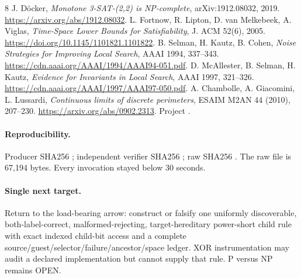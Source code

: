 \documentclass[11pt]{article}
\begin{document}
\begin{thebibliography}{8}
 J. D\"ocker, \emph{Monotone 3-SAT-(2,2) is NP-complete},
arXiv:1912.08032, 2019. \url{https://arxiv.org/abs/1912.08032}.
 L. Fortnow, R. Lipton, D. van Melkebeek, A. Viglas,
\emph{Time-Space Lower Bounds for Satisfiability}, J. ACM 52(6), 2005.
\url{https://doi.org/10.1145/1101821.1101822}.
 B. Selman, H. Kautz, B. Cohen, \emph{Noise Strategies for
Improving Local Search}, AAAI 1994, 337--343.
\url{https://cdn.aaai.org/AAAI/1994/AAAI94-051.pdf}.
 D. McAllester, B. Selman, H. Kautz, \emph{Evidence for
Invariants in Local Search}, AAAI 1997, 321--326.
\url{https://cdn.aaai.org/AAAI/1997/AAAI97-050.pdf}.
 A. Chambolle, A. Giacomini, L. Lussardi, \emph{Continuous
limits of discrete perimeters}, ESAIM M2AN 44 (2010), 207--230.
\url{https://arxiv.org/abs/0902.2313}.
 Project .
\end{thebibliography}

\paragraph{Reproducibility.}
Producer SHA256 ;
independent verifier SHA256 ;
raw SHA256 .
The raw file is 67,194 bytes.  Every invocation stayed below 30 seconds.

\paragraph{Single next target.}
Return to the load-bearing arrow: construct or falsify one uniformly
discoverable, both-label-correct, malformed-rejecting, target-hereditary
power-short child rule with exact indexed child-bit access and a complete
source/guest/selector/failure/ancestor/space ledger.  XOR instrumentation may
audit a declared implementation but cannot supply that rule.  P versus NP
remains OPEN.
\end{document}
